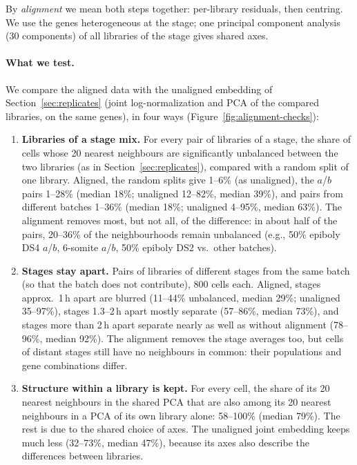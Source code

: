\documentclass[11pt,a4paper]{article}
\begin{document}
By \emph{alignment} we mean both steps together: per-library residuals, then centring. We use the genes heterogeneous at the stage; one principal component analysis (30 components) of all libraries of the stage gives shared axes.

\paragraph{What we test.} We compare the aligned data with the unaligned embedding of Section~\ref{sec:replicates} (joint log-normalization and PCA of the compared libraries, on the same genes), in four ways (Figure~\ref{fig:alignment-checks}):
\begin{enumerate}
	\item \textbf{Libraries of a stage mix.} For every pair of libraries of a stage, the share of cells whose 20 nearest neighbours are significantly unbalanced between the two libraries (as in Section~\ref{sec:replicates}), compared with a random split of one library. Aligned, the random splits give 1--6\% (as unaligned), the $a$/$b$ pairs 1--28\% (median 18\%; unaligned 12--82\%, median 39\%), and pairs from different batches 1--36\% (median 18\%; unaligned 4--95\%, median 63\%). The alignment removes most, but not all, of the difference: in about half of the pairs, 20--36\% of the neighbourhoods remain unbalanced (e.g., 50\% epiboly DS4 $a$/$b$, 6-somite $a$/$b$, 50\% epiboly DS2 vs.\ other batches).
	\item \textbf{Stages stay apart.} Pairs of libraries of different stages from the same batch (so that the batch does not contribute), 800 cells each. Aligned, stages approx.~1\,h apart are blurred (11--44\% unbalanced, median 29\%; unaligned 35--97\%), stages 1.3--2\,h apart mostly separate (57--86\%, median 73\%), and stages more than 2\,h apart separate nearly as well as without alignment (78--96\%, median 92\%). The alignment removes the stage averages too, but cells of distant stages still have no neighbours in common: their populations and gene combinations differ.
	\item \textbf{Structure within a library is kept.} For every cell, the share of its 20 nearest neighbours in the shared PCA that are also among its 20 nearest neighbours in a PCA of its own library alone: 58--100\% (median 79\%). The rest is due to the shared choice of axes. The unaligned joint embedding keeps much less (32--73\%, median 47\%), because its axes also describe the differences between libraries.

\end{enumerate}
\end{document}

